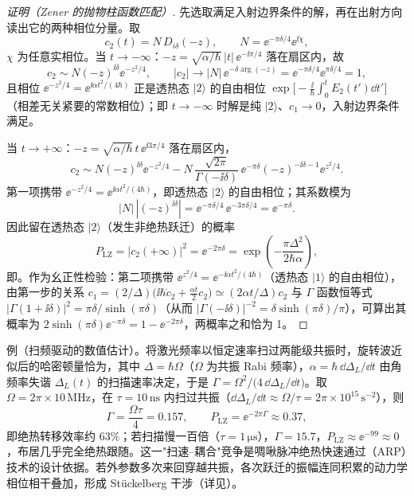 \begin{proof}[证明（Zener 的抛物柱函数匹配）]
先选取满足入射边界条件的解，再在出射方向读出它的两种相位分量。取
\begin{equation*}
c_2(t)=N\,D_{i\delta}(-z),
\qquad
N=\ee^{-\pi\delta/4}\ee^{\ii\chi},
\end{equation*}
$\chi$ 为任意实相位。当 $t\to-\infty$：$-z=\sqrt{\alpha/\hbar}\,|t|\,\ee^{-\ii\pi/4}$ 落在扇区内，故
\[
c_2\sim N(-z)^{\ii\delta}\ee^{-z^2/4},
\qquad
|c_2|\to|N|\,\ee^{-\delta\arg(-z)}=\ee^{-\pi\delta/4}\ee^{\pi\delta/4}=1,
\]
且相位 $\ee^{-z^2/4}=\ee^{\ii\alpha t^2/(4\hbar)}$ 正是透热态 $|2\rangle$ 的自由相位 $\exp\bigl[-\frac{\ii}{\hbar}\int_0^t E_2(t')\dd t'\bigr]$（相差无关紧要的常数相位）；即 $t\to-\infty$ 时解是纯 $|2\rangle$、$c_1\to0$，入射边界条件满足。

当 $t\to+\infty$：$-z=\sqrt{\alpha/\hbar}\,t\,\ee^{\ii3\pi/4}$ 落在扇区内，
\[
c_2\sim N(-z)^{\ii\delta}\ee^{-z^2/4}
-N\,\frac{\sqrt{2\pi}}{\Gamma(-\ii\delta)}\,\ee^{-\pi\delta}(-z)^{-\ii\delta-1}\ee^{z^2/4}.
\]
第一项携带 $\ee^{-z^2/4}=\ee^{\ii\alpha t^2/(4\hbar)}$，即透热态 $|2\rangle$ 的自由相位；其系数模为
\[
|N|\,|(-z)^{\ii\delta}|=\ee^{-\pi\delta/4}\,\ee^{-3\pi\delta/4}=\ee^{-\pi\delta}.
\]
因此留在透热态 $|2\rangle$（发生非绝热跃迁）的概率
\[
P_{\mathrm{LZ}}=|c_2(+\infty)|^2=\ee^{-2\pi\delta}
=\exp\!\left(-\frac{\pi\Delta^2}{2\hbar\alpha}\right),
\]
即。作为幺正性检验：第二项携带 $\ee^{z^2/4}=\ee^{-\ii\alpha t^2/(4\hbar)}$（透热态 $|1\rangle$ 的自由相位），由第一步的关系 $c_1=(2/\Delta)\bigl(\ii\hbar\dot c_2+\tfrac{\alpha t}{2}c_2\bigr)\simeq(2\alpha t/\Delta)c_2$ 与 $\Gamma$ 函数恒等式 $|\Gamma(1+\ii\delta)|^2=\pi\delta/\sinh(\pi\delta)$（从而 $|\Gamma(-\ii\delta)|^{-2}=\delta\sinh(\pi\delta)/\pi$），可算出其概率为 $2\sinh(\pi\delta)\ee^{-\pi\delta}=1-\ee^{-2\pi\delta}$，两概率之和恰为 1。
\end{proof}

例（扫频驱动的数值估计）。将激光频率以恒定速率扫过两能级共振时，旋转波近似后的哈密顿量恰为，其中 $\Delta=\hbar\Omega$（$\Omega$ 为共振 Rabi 频率），$\alpha=\hbar\,\dd\Delta_L/\dd t$ 由角频率失谐 $\Delta_L(t)$ 的扫描速率决定，于是 $\Gamma=\Omega^2\big/\bigl(4\,\dd\Delta_L/\dd t\bigr)$。取 $\Omega=2\pi\times10\,\mathrm{MHz}$，在 $\tau=10\,\mathrm{ns}$ 内扫过共振（$\dd\Delta_L/\dd t\approx\Omega/\tau=2\pi\times10^{15}\,\mathrm{s^{-2}}$），则
\[
\Gamma=\frac{\Omega\tau}{4}=0.157,
\qquad
P_{\mathrm{LZ}}=\ee^{-2\pi\Gamma}\approx0.37,
\]
即绝热转移效率约 $63\%$；若扫描慢一百倍（$\tau=1\,\mathrm{\mu s}$），$\Gamma=15.7$，$P_{\mathrm{LZ}}\approx\ee^{-99}\approx0$，布居几乎完全绝热跟随。这一"扫速--耦合"竞争是啁啾脉冲绝热快速通过（ARP）技术的设计依据。若外参数多次来回穿越共振，各次跃迁的振幅连同积累的动力学相位相干叠加，形成 St\"uckelberg 干涉（详见）。

